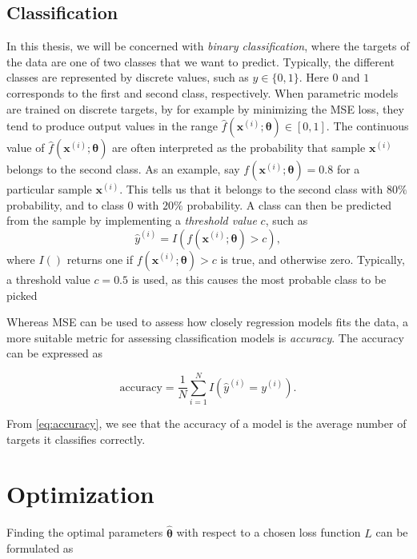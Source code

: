 \subsection{Classification}\label{sec:Classifcation}
In this thesis, we will be concerned with \emph{binary classification}, where the targets of the data are one of two classes that we want to predict. Typically, the different classes are represented by discrete values, such as $y \in \{0,1\}$. Here $0$ and $1$ corresponds to the first and second class, respectively. When parametric models are trained on discrete targets, by for example by minimizing the MSE loss, they tend to produce output values in the range $\hat{f}(\boldsymbol{x}^{(i)}; \boldsymbol{\theta}) \in [0,1]$. The continuous value of $\hat{f}(\boldsymbol{x}^{(i)}; \boldsymbol{\theta})$ are often interpreted as the probability that sample $\boldsymbol{x}^{(i)}$ belongs to the second class. As an example, say $f(\boldsymbol{x}^{(i)}; \boldsymbol{\theta}) = 0.8$ for a particular sample $\boldsymbol{x}^{(i)}$. This tells us that it belongs to the second class with $80\%$ probability, and to class $0$ with $20\%$ probability. A class can then be predicted from the sample by implementing a \emph{threshold value} $c$, such as
\begin{equation}
    \hat{y}^{(i)} = I(f(\boldsymbol{x}^{(i)}; \boldsymbol{\theta}) > c),
\end{equation}
where $I()$ returns one if $f(\boldsymbol{x}^{(i)}; \boldsymbol{\theta}) > c$ is true, and otherwise zero. Typically, a threshold value $c = 0.5$ is used, as this causes the most probable class to be picked  

Whereas MSE can be used to assess how closely regression models fits the data, a more suitable metric for assessing classification models is \emph{accuracy}. The accuracy can be expressed as 

\begin{equation}\label{eq:accuracy}
    \text{accuracy} = \frac{1}{N}\sum_{i=1}^{N} I(\hat{y}^{(i)} = y^{(i)}).
\end{equation}

From \cref{eq:accuracy}, we see that the accuracy of a model is the average number of targets it classifies correctly.  


\section{Optimization}\label{sec:Optimization}
Finding the optimal parameters $\hat{\boldsymbol{\theta}}$ with respect to a chosen loss function $L$ can be formulated as

